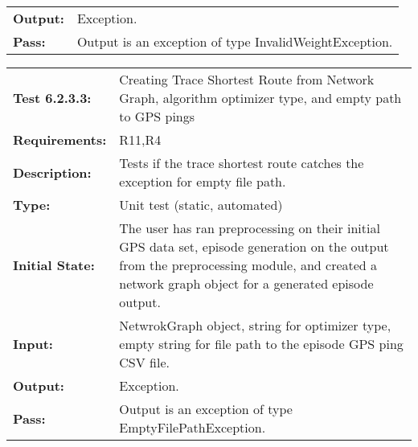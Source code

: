 \documentclass[12pt, titlepage]{article}
\begin{document}
{\begin{tabular}{|l|p{10cm}|}
    \bf{Output}: & Exception. \\
    \bf{Pass}: & Output is an exception of type InvalidWeightException. \\
    \hline
\end{tabular}
\begin{tabular}{|l|p{10cm}|}
    \hline
    \bf{Test} 6.2.3.3: & Creating Trace Shortest Route from Network Graph, algorithm optimizer type, and empty path to GPS pings \\
    \bf{Requirements}: & R11,R4 \\
    \bf{Description}: & Tests if the trace shortest route catches the exception for empty file path. \\
    \bf{Type}: & Unit test (static, automated) \\
    \bf{Initial State}: & The user has ran preprocessing on their initial GPS data set, episode generation on the output from the preprocessing module, and created a network graph object for a generated episode output. \\
    \bf{Input}: & NetwrokGraph object, string for optimizer type, empty string for file path to the episode GPS ping CSV file. \\
    \bf{Output}: & Exception. \\
    \bf{Pass}: & Output is an exception of type EmptyFilePathException. \\
    \hline
\end{tabular}
}
\end{document}
